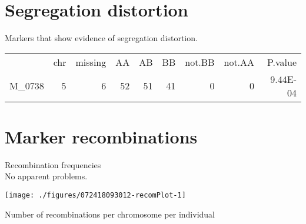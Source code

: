 \documentclass[a4paper,11pt]{article}\usepackage[]{graphicx}\usepackage[]{color}
\newenvironment{knitrout}{}{} %
\begin{document}
\section{Segregation distortion}
Markers that show evidence of segregation distortion.
\begin{table}[ht]
\begin{flushleft}
\begin{tabular}{lrrrrrrrr}
  & chr & missing & AA & AB & BB & not.BB & not.AA & P.value \\ 
 M\_0738 & 5 & 6 & 52 & 51 & 41 & 0 & 0 & 9.44E-04 \\ 
  \end{tabular}
\label{segrDist}
\end{flushleft}
\end{table}

\clearpage
\section{Marker recombinations}
Recombination frequencies\\
No apparent problems.

\begin{knitrout}
\color{fgcolor}
\texttt{[image: ./figures/072418093012-recomPlot-1]} 

\end{knitrout}
\newpage
Number of recombinations per chromosome per individual
\end{document}
